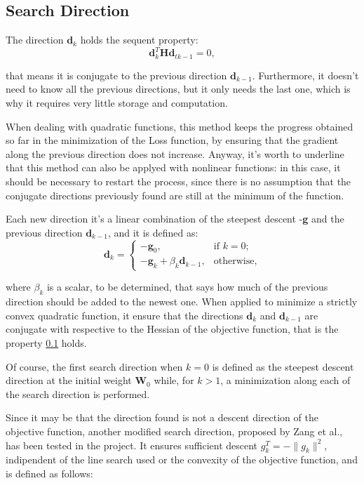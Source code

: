 		\subsection{Search Direction}
		\label{sub:search_direction}
			The direction $\textbf{d}_k$ holds the sequent property:
			\begin{equation}
			\textbf{d}_k^T\textbf{H}\textbf{d}_{tk-1} = 0,
			\end{equation}

		 	that means it is conjugate to the previous direction $\textbf{d}_{k-1}$. Furthermore, it doesn't need to know all the 	previous directions, but it only needs the last one, which is why it requires very little storage and computation.

			When dealing with quadratic functions, this method keeps the progress obtained so far in the minimization of the Loss function, by ensuring that the gradient along the previous direction does not increase.
			Anyway, it's worth to underline that this method can also be applyed with nonlinear functions: in this case, it should be necessary to restart the process, since there is no assumption that the conjugate directions previously found are still at the minimum of the function.

			Each new direction it's a linear combination of the steepest descent -\textbf{g} and the previous direction $\textbf{d}_{k-1}$, and it is defined as:
			\begin{equation}
			\label{dir}
			  \textbf{d}_k=\begin{cases}
			    -\textbf{g}_0, & \text{if $k=0$};\\
			    -\textbf{g}_k + \beta_k\textbf{d}_{k-1}, & \text{otherwise,}
			  \end{cases}
			\end{equation}

			where $\beta_k$ is a scalar, to be determined, that says how much of the previous direction should be added to the newest one. When applied to minimize a strictly convex quadratic function, it ensure that the directions $\textbf{d}_{k}$ and $\textbf{d}_{k-1}$ are conjugate with respective to the Hessian of the objective function, that is the property \ref{sub:search_direction} holds.

			Of course, the first search direction when $k = 0$ is defined as the steepest descent direction at the initial weight $\textbf{W}_0$ while, for $k > 1$, a minimization along each of the search direction is performed.

			Since it may be that the direction found is not a descent direction of the objective function, another modified search direction, proposed by Zang et al.\cite{L-2006}, has been tested in the project. It ensures sufficient descent $g_k^T = -\|g_k\|^2$, indipendent of the line search used or the convexity of the objective function, and is defined as follows:

